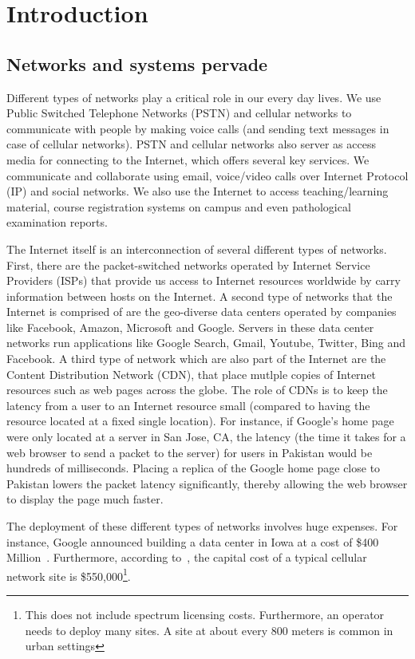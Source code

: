 \chapter{Introduction}
\label{chap:intro}

\section{Networks and systems pervade}
Different types of networks play a critical role in our every day lives. We use Public Switched Telephone Networks (PSTN) and cellular networks to communicate with people by making voice calls (and sending text messages in case of cellular networks). PSTN and cellular networks also server as access media for connecting to the Internet, which offers several key services. We communicate and collaborate using email, voice/video calls over Internet Protocol (IP) and social networks. We also use the Internet to access teaching/learning material, course registration systems on campus and even pathological examination reports. 

The Internet itself is an interconnection of several different types of networks. First, there are the packet-switched networks operated by Internet Service Providers (ISPs) that provide us access to Internet resources worldwide by carry information between hosts on the Internet. A second type of networks that the Internet is comprised of are the geo-diverse data centers operated by companies like Facebook, Amazon, Microsoft and Google. Servers in these data center networks run applications like Google Search, Gmail, Youtube, Twitter, Bing and Facebook. A third type of network which are also part of the Internet are the Content Distribution Network (CDN), that place mutlple copies of Internet resources such as web pages across the globe. The role of CDNs is to keep the latency from a user to an Internet resource small (compared to having the resource located at a fixed single location). For instance, if Google's home page were only located at a server in San Jose, CA, the latency (the time it takes for a web browser to send a packet to the server) for users in Pakistan would be hundreds of milliseconds. Placing a replica of the Google home page close to Pakistan lowers the packet latency significantly, thereby allowing the web browser to display the page much faster.

The deployment of these different types of networks involves huge expenses. For instance, Google announced building a data center in Iowa at a cost of \$400 Million~\cite{CostOfADC}. Furthermore, according to~\cite{costcellsite}, the capital cost of a typical cellular network site is \$550,000\footnote{This does not include spectrum licensing costs. Furthermore, an operator needs to deploy many sites. A site at about every 800 meters is common in urban settings}. 

